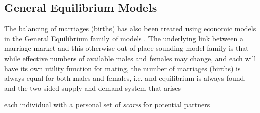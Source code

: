\subsection{General Equilibrium Models}
The balancing of marriages (births) has also been treated using economic models
in the General Equilibrium family of models \citep{}. The underlying
link between a marriage market and this otherwise out-of-place sounding model
family is that while effective numbers of available males and females may
change, and each will have its own utility function for mating, the number of
marriages (births) is always equal for both males and females, i.e. and
equilibrium is always found. and the two-sided supply and demand system that
arises

 each individual with a
personal set of \textit{scores} for potential partners

